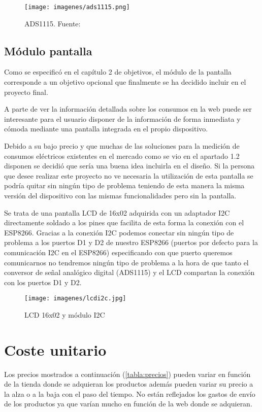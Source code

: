 \begin{figure}[H]
	\centering
	\texttt{[image: imagenes/ads1115.png]}
	\caption[ADS1115.]{ADS1115. Fuente: \cite{adsfoto}}
	\label{fig:ads}
\end{figure}
\subsection{Módulo pantalla}

Como se especificó en el capítulo 2 de objetivos, el módulo de la pantalla corresponde a un objetivo opcional que finalmente se ha decidido incluir en el proyecto final.

A parte de ver la información detallada sobre los consumos en la web puede ser interesante para el usuario disponer de la información de forma inmediata y cómoda mediante una pantalla integrada en el propio dispositivo.

Debido a su bajo precio y que muchas de las soluciones para la medición de consumos eléctricos existentes en el mercado como se vio en el apartado 1.2 disponen se decidió que sería una buena idea incluirla en el diseño. Si la persona que desee realizar este proyecto no ve necesaria la utilización de esta pantalla se podría quitar sin ningún tipo de problema teniendo de esta manera la misma versión del dispositivo con las mismas funcionalidades pero sin la pantalla. 

Se trata de una pantalla LCD de 16x02 adquirida con un adaptador I2C directamente soldado a los pines que facilita de esta forma la conexión con el ESP8266. Gracias a la conexión I2C podemos conectar sin ningún tipo de problema a los puertos D1 y D2 de nuestro ESP8266 (puertos por defecto para la comunicación I2C en el ESP8266) especificando con que puerto queremos comunicarnos no tendremos ningún tipo de problema a la hora de que tanto el conversor de señal analógico digital (ADS1115) y el LCD compartan la conexión con los puertos D1 y D2.

\begin{figure}[H]
	\centering
	\texttt{[image: imagenes/lcdi2c.jpg]}
	\caption{LCD 16x02 y módulo I2C}
	\label{fig:lcdi2c}
\end{figure}

\section{Coste unitario}
Los precios mostrados a continuación (\ref{tabla:precios}) pueden variar en función de la tienda donde se adquieran los productos además pueden variar su precio a la alza o a la baja con el paso del tiempo. No están reflejados los gastos de envío de los productos ya que varían mucho en función de la web donde se adquieran.

